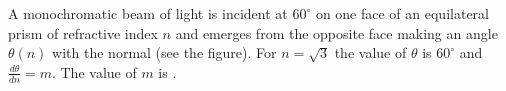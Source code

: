 
\item A monochromatic beam of light is incident at \( 60^\circ \) on one face of an equilateral prism of refractive index \( n \) and emerges from the opposite face making an angle \( \theta(n) \) with the normal (see the figure). For \( n = \sqrt{3} \) the value of \( \theta \) is \( 60^\circ \) and \( \frac{d\theta}{dn} = m \). The value of \( m \) is \underline{\hspace{2.5 cm}}.
    \begin{center}
    \end{center}
